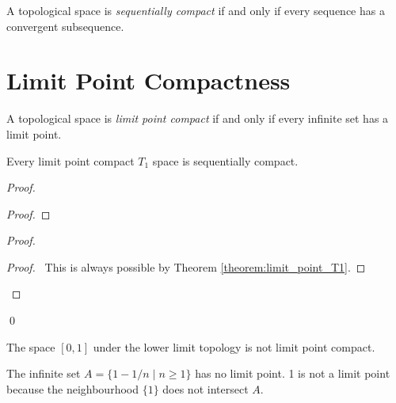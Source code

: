 \begin{definition}
    A topological space is \emph{sequentially compact} if and only if
    every sequence has a convergent subsequence.
\end{definition}

\section{Limit Point Compactness}

\begin{definition}
    A topological space is \emph{limit point compact} if and only if every
    infinite set has a limit point.
\end{definition}

\begin{proposition}
    \label{proposition:limit_point_compact_sequentially_compact}
    Every limit point compact $T_1$ space is sequentially compact.
\end{proposition}

\begin{proof}
    \pf
    \begin{proof}
    \end{proof}
    \begin{proof}
        \begin{proof}
            \pf\ This is always possible by Theorem \ref{theorem:limit_point_T1}.
        \end{proof}
    \end{proof}
    \qed
\end{proof}

\begin{example}
    The space $[0,1]$ under the lower limit topology is not limit point compact.

    The infinite set $A = \{ 1 - 1/n \mid n \geq 1 \}$ has no limit point. 1 is not a limit point
    because the neighbourhood $\{1\}$ does not intersect $A$.
\end{example}


